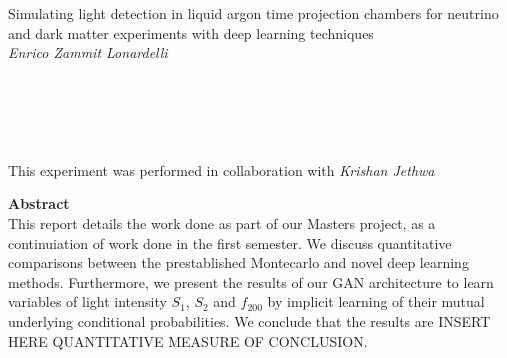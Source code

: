 \documentclass[11pt]{article} %
\begin{document}



\begin{center} %

{\Huge Simulating light detection in liquid argon time projection chambers for neutrino and dark matter experiments with deep learning techniques}\\[0.5cm] %
\vspace{5mm}
\textit{Enrico Zammit Lonardelli}
\\
\vspace{5mm}
\\
\vspace{5mm}
\\
\vspace{5mm}
\\
\vspace{5mm}
\\
\vspace{5mm}
\\
\vspace{5mm}
This experiment was performed in collaboration with \textit{Krishan Jethwa}\\[0.3cm] %

\end{center}
\vspace{60mm}
{\Large \textbf{Abstract}}
\vspace{2mm}
\\
This report details the work done as part of our Masters project, as a continuiation of work done in the first semester.
We discuss quantitative comparisons between the prestablished Montecarlo and novel deep learning methods.
Furthermore, we present the results of our GAN architecture to learn variables of light intensity $S_1$, $S_2$ and $f_{200}$ by implicit learning of their mutual underlying conditional probabilities.
We conclude that the results are INSERT HERE QUANTITATIVE MEASURE OF CONCLUSION.
\end{document}
